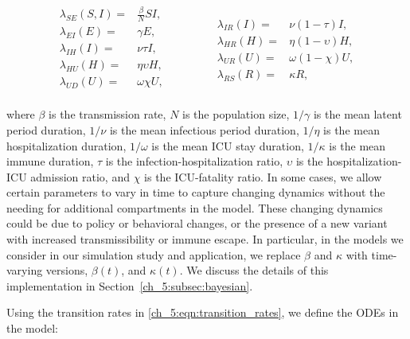 \begin{equation}
\begin{aligned}
\lambda_{SE}(S, I)  =&  \frac{\beta}{N} S I,   \\
\lambda_{EI}(E)  =& \gamma E,    \\
\lambda_{IH}(I)  =& \nu \tau I,   \\
\lambda_{HU}(H)  =& \eta  \upsilon H,   \\
\lambda_{UD}(U)  =& \omega \chi U, \\
\end{aligned}
\qquad \quad \quad
\begin{aligned}
\lambda_{IR}(I)  =& \nu \left(1 - \tau \right) I,   \\
\lambda_{HR}(H)  =& \eta \left(1 - \upsilon \right) H, \\
\lambda_{UR}(U)  =& \omega \left( 1 - \chi \right) U,    \\
\lambda_{RS}(R)  =& \kappa R,
\end{aligned}
\label{ch_5:eqn:transition_rates}
\end{equation}

where \( \beta \) is the transmission rate, \( N \) is the population size, \( 1 / \gamma  \) is the mean latent period duration, \( 1 / \nu \) is the mean infectious period duration, \( 1 / \eta \) is the mean hospitalization duration, \( 1 / \omega \) is the mean ICU stay duration, \( 1 / \kappa \) is the mean immune duration, \( \tau \) is the infection-hospitalization ratio, \( \upsilon \) is the hospitalization-ICU admission ratio, and \( \chi \) is the ICU-fatality ratio.
In some cases, we allow certain parameters to vary in time to capture changing dynamics without the needing for additional compartments in the model.
These changing dynamics could be due to policy or behavioral changes, or the presence of a new variant with increased transmissibility or immune escape.
In particular, in the models we consider in our simulation study and application, we replace \( \beta \) and \( \kappa \) with time-varying versions, \( \beta(t) \), and \( \kappa(t) \).
We discuss the details of this implementation in Section~\ref{ch_5:subsec:bayesian}.

Using the transition rates in \eqref{ch_5:eqn:transition_rates}, we define the ODEs in the model:

